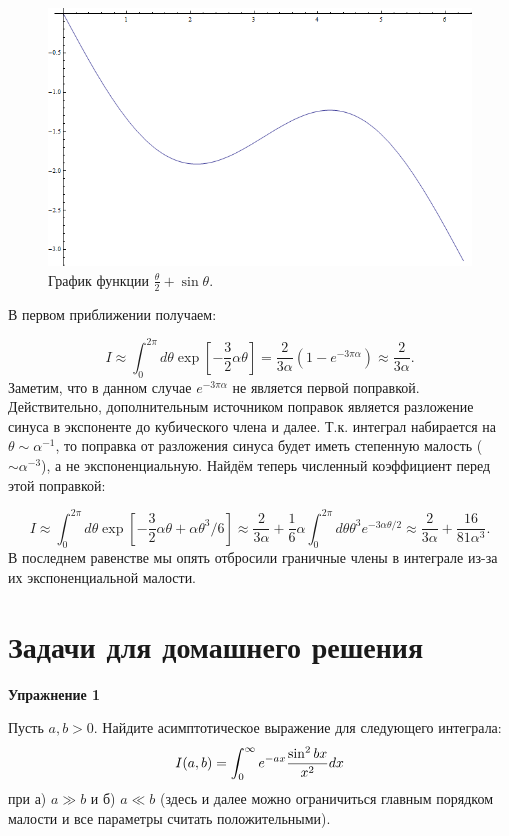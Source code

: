 \documentclass[a4paper,12pt]{article}
\begin{document}
\begin{figure}[ht]
\includegraphics[width=0.8\linewidth]{Task_4.png}
\caption{График функции $\frac{\theta}{2}+\sin\theta$.}
\label{exp_plot}
\end{figure}

\noindent
В первом приближении получаем:

\[
I\approx\int_0^{2\pi}d\theta\exp\left[-\frac{3}{2}\alpha\theta\right]=\frac{2}{3\alpha}\left(1-e^{-3\pi\alpha}\right)\approx\frac{2}{3\alpha}.
\]
Заметим, что в данном случае $e^{-3\pi\alpha}$ не является первой поправкой. Действительно, дополнительным источником поправок является разложение синуса в экспоненте до кубического члена и далее. Т.к. интеграл набирается на $\theta\sim\alpha^{-1}$, то поправка от разложения синуса будет иметь степенную малость ($\sim\alpha^{-3}$), а не экспоненциальную. Найдём теперь численный коэффициент перед этой поправкой:

\[
I\approx\int_0^{2\pi}d\theta\exp\left[-\frac{3}{2}\alpha\theta+\alpha\theta^3/6\right]\approx\frac{2}{3\alpha}+\frac{1}{6}\alpha\int_0^{2\pi}d\theta\theta^3e^{-3\alpha\theta/2}\approx\frac{2}{3\alpha}+\frac{16}{81\alpha^3}.
\]
В последнем равенстве мы опять отбросили граничные члены в интеграле из-за их экспоненциальной малости.

\newpage

\section*{Задачи для домашнего решения}
\noindent \textbf{Упражнение 1}

\noindent Пусть $a,b>0$. Найдите асимптотическое выражение для следующего интеграла:
\begin{equation}\notag
I(a,b)=\int_{0}^{\infty}e^{-ax}\frac{\sin^{2}bx}{x^{2}}dx	
\end{equation}
\noindent при а) $a\gg b$ и б) $a\ll b$ (здесь и далее можно ограничиться главным порядком малости и все параметры считать положительными).
\end{document}
